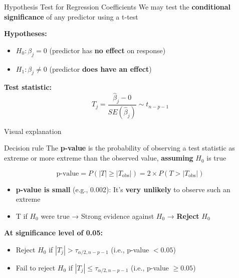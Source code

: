 \documentclass[
  ignorenonframetext,
]{beamer}
\providecommand{\tightlist}{%
  \setlength{\itemsep}{0pt}\setlength{\parskip}{0pt}}
\begin{document}
\begin{frame}{Hypothesis Test for Regression Coefficients}
\label{hypothesis-test-for-regression-coefficients}
We may test the \textbf{conditional significance} of any predictor using
a t-test

\textbf{Hypotheses:}

\begin{itemize}
\item
  \(H_0: \beta_j = 0\) (predictor has \textbf{no effect} on response)
\item
  \(H_1: \beta_j \neq 0\) (predictor \textbf{does have an effect})
\end{itemize}

\textbf{Test statistic:}
\[T_j = \frac{\widehat{\beta}_j-0}{SE(\widehat{\beta}_j)} \sim t_{n-p-1}\]
\end{frame}

\begin{frame}{Visual explanation}
\label{visual-explanation}
\end{frame}

\begin{frame}{Decision rule}
\label{decision-rule}
The \textbf{p-value} is the probability of observing a test statistic as
extreme or more extreme than the observed value, \textbf{assuming}
\(H_0\) is true

\[\text{p-value} = P(|T| \geq |T_{\text{obs}}|) = 2 \times P(T > |T_{\text{obs}}|)\]

\begin{itemize}
\tightlist
\item
  \textbf{p-value is small} (e.g., 0.002): It's \textbf{very unlikely}
  to observe such an extreme
\item
  T if \(H_0\) were true → Strong evidence against \(H_0\) →
  \textbf{Reject} \(H_0\)
\end{itemize}

\textbf{At significance level of 0.05:}

\begin{itemize}
\tightlist
\item
  Reject \(H_0\) if \(|T_j| > \tau_{\alpha/2, n-p-1}\) (i.e., p-value
  \(< 0.05\))
\item
  Fail to reject \(H_0\) if \(|T_j| \leq \tau_{\alpha/2, n-p-1}\) (i.e.,
  p-value \(\geq 0.05\))
\end{itemize}
\end{frame}
\end{document}
